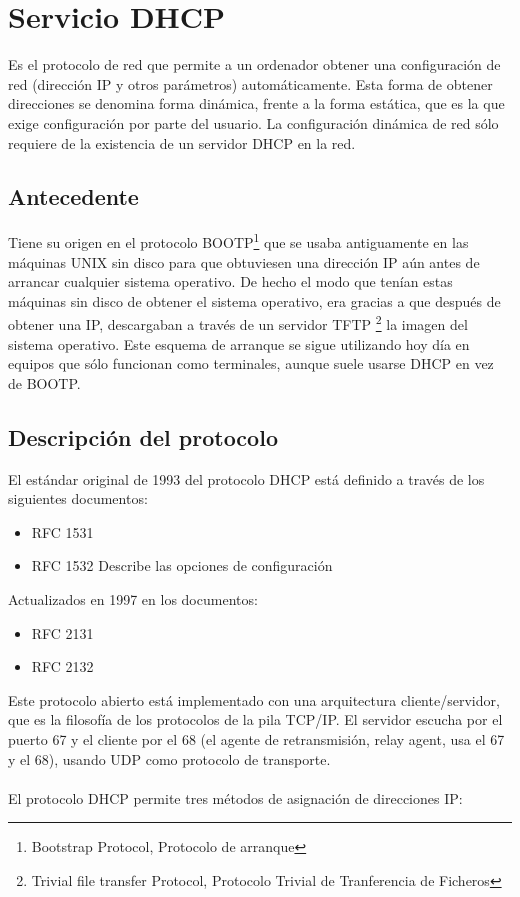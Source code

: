 \section{Servicio DHCP}
	Es el protocolo de red que permite a un ordenador obtener una configuración de red (dirección IP y otros parámetros) automáticamente. Esta forma de obtener direcciones se denomina forma dinámica, frente a la forma estática, que es la que exige configuración por parte del usuario. La configuración dinámica de red sólo requiere de la existencia de un servidor DHCP en la red.
	
	\subsection{Antecedente}
		Tiene su origen en el protocolo BOOTP\footnote{Bootstrap Protocol, Protocolo de arranque} que se usaba antiguamente en las máquinas UNIX sin disco para que obtuviesen una dirección IP aún antes de arrancar cualquier sistema operativo. De hecho el modo que tenían estas máquinas sin disco de obtener el sistema operativo, era gracias a que después de obtener una IP, descargaban a través de un servidor TFTP \footnote{Trivial file transfer Protocol, Protocolo Trivial de Tranferencia de Ficheros} la imagen del sistema operativo. Este esquema de arranque se sigue utilizando hoy día en equipos que sólo funcionan como terminales, aunque suele usarse DHCP en vez de BOOTP.
	
	\subsection{Descripción del protocolo}
	El estándar original de 1993 del protocolo DHCP está definido a través de los siguientes documentos:
		\begin{itemize}
			\item{RFC 1531}
			\item{RFC 1532 Describe las opciones de configuración}
		\end{itemize}
	Actualizados en 1997 en los documentos:
		\begin{itemize}
			\item{RFC 2131}
			\item{RFC 2132}
		\end{itemize}	
		
Este protocolo abierto está implementado con una arquitectura cliente/servidor, que es la filosofía de los protocolos de la pila TCP/IP. El servidor escucha por el puerto 67 y el cliente por el 68 (el agente de retransmisión, relay agent, usa el 67 y el 68), usando UDP como protocolo de transporte.\\\\
El protocolo DHCP permite tres métodos de asignación de direcciones IP:

